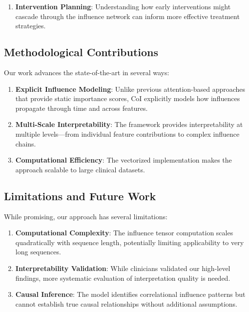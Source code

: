 \documentclass[letterpaper]{article}
\begin{document}
\begin{enumerate}
\begin{enumerate}
    \item \textbf{Intervention Planning}: Understanding how early interventions might cascade through the influence network can inform more effective treatment strategies.
\end{enumerate}

\subsection{Methodological Contributions}

Our work advances the state-of-the-art in several ways:

\begin{enumerate}
    \item \textbf{Explicit Influence Modeling}: Unlike previous attention-based approaches that provide static importance scores, CoI explicitly models how influences propagate through time and across features.
    
    \item \textbf{Multi-Scale Interpretability}: The framework provides interpretability at multiple levels—from individual feature contributions to complex influence chains.
    
    \item \textbf{Computational Efficiency}: The vectorized implementation makes the approach scalable to large clinical datasets.
\end{enumerate}

\subsection{Limitations and Future Work}

While promising, our approach has several limitations:

\begin{enumerate}
    \item \textbf{Computational Complexity}: The influence tensor computation scales quadratically with sequence length, potentially limiting applicability to very long sequences.
    
    \item \textbf{Interpretability Validation}: While clinicians validated our high-level findings, more systematic evaluation of interpretation quality is needed.
    
    \item \textbf{Causal Inference}: The model identifies correlational influence patterns but cannot establish true causal relationships without additional assumptions.
\end{enumerate}


\end{enumerate}
\end{document}

